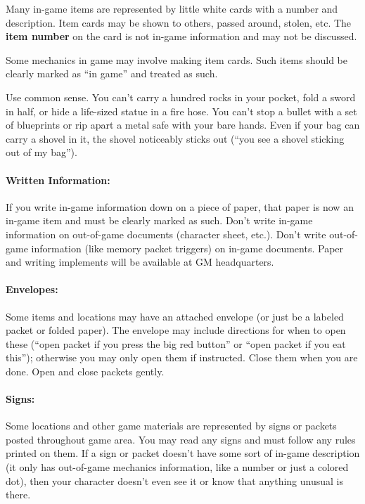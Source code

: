 \documentclass[sheet]{GL2020}
\begin{document}
Many in-game items are represented by little white cards with a number and description.  Item cards may be shown to others, passed around, stolen, etc.  The {\bf item number} on the card is not in-game information and may not be discussed.  

Some mechanics in game may involve making item cards. Such items should be clearly marked as ``in game'' and treated as such.

Use common sense. You can't carry a hundred rocks in your pocket, fold a sword in half, or hide a life-sized statue in a fire hose. You can't stop a bullet with a set of blueprints or rip apart a metal safe with your bare hands.  Even if your bag can carry a shovel in it, the shovel noticeably sticks out (``you see a shovel sticking out of my bag'').

\paragraph{Written Information:} If you write in-game information down on a piece of paper, that paper is now an in-game item and must be clearly marked as such. Don't write in-game information on out-of-game documents (character sheet, etc.). Don't write out-of-game information (like memory packet triggers) on in-game documents. Paper and writing implements will be available at GM headquarters.

\paragraph{Envelopes:} Some items and locations may have an attached envelope (or just be a labeled packet or folded paper). The envelope may include directions for when to open these (``open packet if you press the big red button'' or ``open packet if you eat this''); otherwise you may only open them if instructed.  Close them when you are done.  Open and close packets gently.

\paragraph{Signs:} Some locations and other game materials are represented by signs or packets posted throughout game area. You may read any signs and must follow any rules printed on them. If a sign or packet doesn't have some sort of in-game description (it only has out-of-game mechanics information, like a number or just a colored dot), then your character doesn't even see it or know that anything unusual is there.
\end{document}
